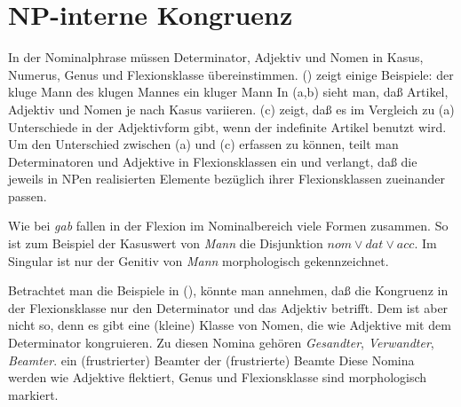 \section{NP-interne Kongruenz}
\label{sec-np-kongruenz}

In
der Nominalphrase müssen Determinator, Adjektiv und Nomen in Kasus, Numerus, Genus 
und Flexionsklasse übereinstimmen. () zeigt einige Beispiele:
\eal
\ex der kluge  Mann
\ex des klugen Mannes
\ex ein kluger Mann
\zl
In (a,b) sieht man, daß Artikel, Adjektiv und Nomen je nach Kasus variieren. (c)
zeigt, daß es im Vergleich zu (a) Unterschiede in der Adjektivform gibt, wenn
der indefinite Artikel benutzt wird. Um den Unterschied zwischen (a) und (c)
erfassen zu können, teilt man Determinatoren und Adjektive in Flexionsklassen ein und
verlangt, daß die jeweils in NPen realisierten Elemente bezüglich ihrer Flexionsklassen
zueinander passen.

Wie bei \emph{gab} fallen in der Flexion im Nominalbereich viele Formen zusammen.
So ist zum Beispiel der Kasuswert von \emph{Mann} die Disjunktion
$nom \vee dat \vee acc$.
Im Singular ist nur der Genitiv von \emph{Mann} morphologisch gekennzeichnet.

Betrachtet man die Beispiele in (), könnte man annehmen, daß die Kongruenz
in der Flexionsklasse nur den Determinator und das Adjektiv betrifft. Dem ist aber nicht so,
denn es gibt eine (kleine) Klasse von Nomen, die wie Adjektive mit dem Determinator kongruieren.
Zu diesen Nomina gehören \emph{Gesandter}, \emph{Verwandter}, \emph{Beamter}.
\eal
\ex ein (frustrierter) Beamter
\ex der (frustrierte)  Beamte
\zl
Diese Nomina werden wie Adjektive flektiert, Genus und Flexionsklasse sind morphologisch markiert.



